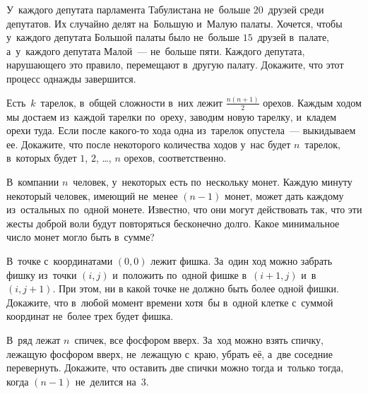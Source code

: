 


\begin{problems}

\item
У~каждого депутата парламента Табулистана не~больше $20$~друзей среди
депутатов.
Их случайно делят на~Большую и~Малую палаты.
Хочется, чтобы у~каждого депутата Большой палаты было не~больше $15$~друзей
в~палате, а~у~каждого депутата Малой~--- не~больше пяти.
Каждого депутата, нарушающего это правило, перемещают в~другую палату.
Докажите, что этот процесс однажды завершится.

\item
Есть~$k$~тарелок, в~общей сложности в~них лежит $\frac{n (n + 1)}{2}$ орехов.
Каждым ходом мы достаем из~каждой тарелки по~ореху, заводим новую тарелку,
и~кладем орехи туда.
Если после какого-то хода одна из~тарелок опустела~--- выкидываем ее.
Докажите, что после некоторого количества ходов у~нас будет $n$~тарелок,
в~которых будет $1$, $2$, \ldots, $n$ орехов, соответственно.

\item
В~компании $n$~человек, у~некоторых есть по~нескольку монет.
Каждую минуту некоторый человек, имеющий не~менее $(n - 1)$ монет, может дать
каждому из~остальных по~одной монете.
Известно, что они могут действовать так, что эти жесты доброй воли будут
повторяться бесконечно долго.
Какое минимальное число монет могло быть в~сумме?

\item
В~точке с~координатами $(0, 0)$ лежит фишка.
За~один ход можно забрать фишку из~точки $(i, j)$ и~положить по~одной фишке
в~$(i + 1, j)$ и~в~$(i, j + 1)$.
При этом, ни в какой точке не должно быть более одной фишки.
Докажите, что в~любой момент времени хотя~бы в~одной клетке с~суммой координат
не~более трех будет фишка.

\item
В~ряд лежат $n$~спичек, все фосфором вверх.
За~ход можно взять спичку, лежащую фосфором вверх, не~лежащую с~краю, убрать
её, а~две соседние перевернуть.
Докажите, что оставить две спички можно тогда и~только тогда, когда $(n - 1)$
не~делится на~$3$.

\end{problems}

